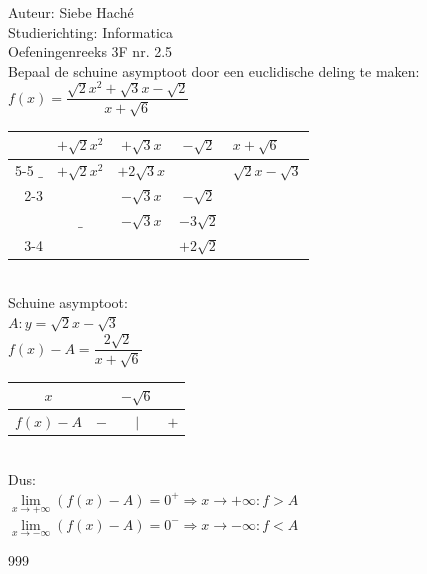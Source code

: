 \documentclass[a4paper]{article}
\begin{document}
\noindent \large Auteur: Siebe Haché \\
\noindent \large Studierichting: Informatica \\
\noindent \large Oefeningenreeks 3F nr. 2.5 \\

\medskip
\normalsize
Bepaal de schuine asymptoot door een euclidische deling te maken: \\

$ f(x) = \dfrac{\sqrt{2}x^2 + \sqrt{3}x - \sqrt{2}}{x + \sqrt{6}} $\\

\bigskip

\begin{tabular}{rccc|l}
     & $+\sqrt{2}x^2$  & $+\sqrt{3}x$  & $-\sqrt{2}$  & $x + \sqrt{6}$ \\ \cline{5-5} 
$\_$ & $+\sqrt{2}x^2$  & $+2\sqrt{3}x$  &              & $\sqrt{2}x - \sqrt{3}$ \\ \cline{2-3}
     &         & $-\sqrt{3}x$   & $-\sqrt{2}$        &\\
     & $\_$     & $-\sqrt{3}x$  & $-3\sqrt{2}$       &\\ \cline{3-4}
     &          &       &  $+2\sqrt{2}$             & \\ 
\end{tabular}\\

Schuine asymptoot:\\

$A: y = \sqrt{2}x - \sqrt{3}$ \\

$ f(x) - A = \dfrac{2\sqrt{2}}{x + \sqrt{6}}$\\

\begin{tabular}{c|ccc}
$x$		   &     & $-\sqrt{6}$ &     \\ \hline
$f(x) - A$ & $-$ & $|$         & $+$ \\
\end{tabular}\\

Dus:\\

$ \lim\limits_{x \rightarrow +\infty} (f(x) - A) = 0^+ \Rightarrow x \rightarrow +\infty : f > A $ \\ 

$ \lim\limits_{x \rightarrow -\infty} (f(x) - A) = 0^- \Rightarrow x \rightarrow -\infty : f < A $ \\ 

\begin{thebibliography}{999}
\end{thebibliography}
\end{document}
